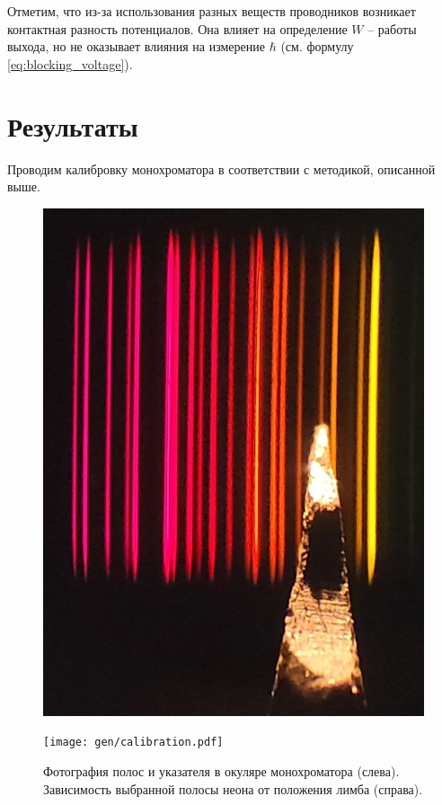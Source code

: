 \documentclass[12pt,a4paper]{article}
\begin{document}
	Отметим, что из-за использования разных веществ проводников возникает контактная разность потенциалов. Она влияет на определение $W$ -- работы выхода, но не оказывает влияния на измерение $\hbar$ (см. формулу \ref{eq:blocking_voltage}).
	
	\newpage
	\section*{Результаты}
	
	Проводим калибровку монохроматора в соответствии с методикой, описанной выше.
	
	\begin{figure}[H]
		\centering
		\begin{minipage}{0.35\textwidth}
			\centering
			\includegraphics[width=0.9\linewidth]{photos/spectrum.jpg}
		\end{minipage}%
		\begin{minipage}{0.65\textwidth}
			\centering
			\texttt{[image: gen/calibration.pdf]}
		\end{minipage}
		\caption{\centering
				 Фотография полос и указателя в окуляре монохроматора (слева). \newline
				 Зависимость выбранной полосы неона от положения лимба (справа).}
		\label{fig:setup}
	\end{figure}
	
\end{document}
